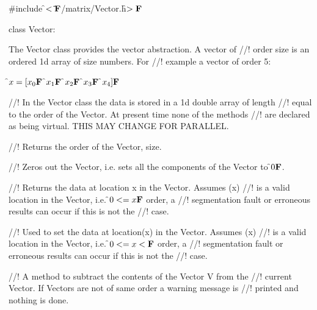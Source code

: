 
\indent \#include \f$<\tilde{}{\bf F}$/matrix/Vector.h\f$>{\bf F}$

\indent class Vector:


\indent The Vector class provides the vector abstraction. A vector of
//! order \p size is an ordered 1d array of \p size numbers. For
//! example a vector of order 5:

\indent\indent \f$ x = [x_0{\bf F}$ \f$x_1{\bf F}$ \f$x_2{\bf F}$  \f$x_3{\bf F}$ \f$x_4]{\bf F}$


//! In the Vector class the data is stored in a 1d double array of length
//! equal to the order of the Vector.  At present time none of the methods
//! are declared as being virtual. THIS MAY CHANGE FOR PARALLEL.


//! Returns the order of the Vector, \p size.

//! Zeros out the Vector, i.e. sets all the components of the Vector to
\f$0{\bf F}$.

//! Returns the data at location \p x in the Vector. Assumes (\p x) 
//! is a valid location in the Vector, i.e. \f$0 <= x {\bf F}$ order, a
//! segmentation fault or erroneous results can occur if this is not the 
//! case. 

//! Used to set the data at location(\p x) in the Vector. Assumes (\p x)
//! is a valid location in the Vector, i.e. \f$0 <= x < {\bf F}$ order, a
//! segmentation fault or erroneous results can occur if this is not the
//! case. 



//! A method to subtract the contents of the Vector \p V from the
//! current Vector. If Vectors are not of same order a warning message is
//! printed and nothing is done. 









